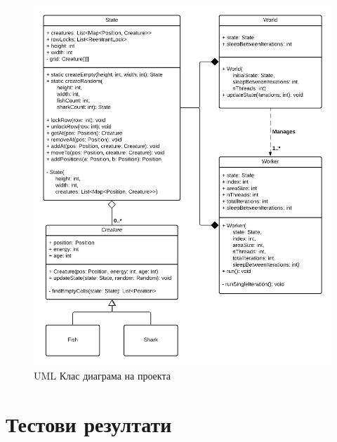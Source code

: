 \documentclass{article}
\begin{document}
\begin{figure}[H]
	\centering
	\includegraphics[width=1.2\textwidth]{classes-uml.png}
	\caption{UML Клас диаграма на проекта}
	\label{fig:figure1}
\end{figure}


\section{Тестови резултати}
\end{document}
